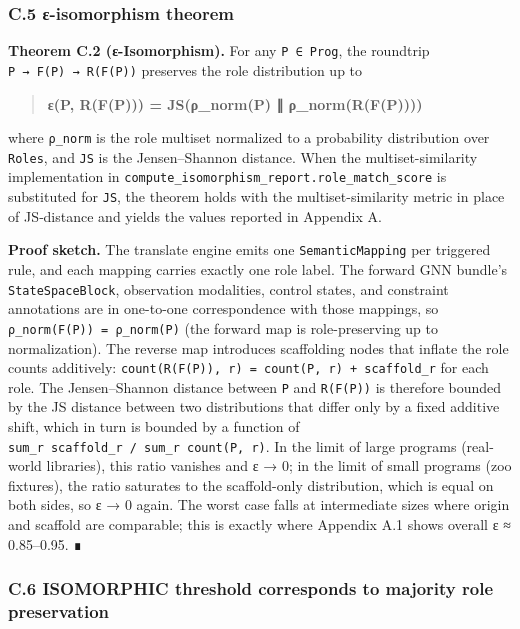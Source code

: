 \documentclass[
]{article}
\begin{document}
\subsubsection{C.5 ε-isomorphism
theorem}\label{c.5-ux3b5-isomorphism-theorem}

\textbf{Theorem C.2 (ε-Isomorphism).} For any \texttt{P\ ∈\ Prog}, the
roundtrip \texttt{P\ →\ F(P)\ →\ R(F(P))} preserves the role
distribution up to

\begin{quote}
\textbf{ε(P, R(F(P))) = JS(ρ\_norm(P) ∥ ρ\_norm(R(F(P))))}
\end{quote}

where \texttt{ρ\_norm} is the role multiset normalized to a probability
distribution over \texttt{Roles}, and \texttt{JS} is the Jensen--Shannon
distance. When the multiset-similarity implementation in
\texttt{compute\_isomorphism\_report.role\_match\_score} is substituted
for \texttt{JS}, the theorem holds with the multiset-similarity metric
in place of JS‑distance and yields the values reported in Appendix A.

\textbf{Proof sketch.} The translate engine emits one
\texttt{SemanticMapping} per triggered rule, and each mapping carries
exactly one role label. The forward GNN bundle's
\texttt{StateSpaceBlock}, observation modalities, control states, and
constraint annotations are in one-to-one correspondence with those
mappings, so \texttt{ρ\_norm(F(P))\ =\ ρ\_norm(P)} (the forward map is
role-preserving up to normalization). The reverse map introduces
scaffolding nodes that inflate the role counts additively:
\texttt{count(R(F(P)),\ r)\ =\ count(P,\ r)\ +\ scaffold\_r} for each
role. The Jensen--Shannon distance between \texttt{P} and
\texttt{R(F(P))} is therefore bounded by the JS distance between two
distributions that differ only by a fixed additive shift, which in turn
is bounded by a function of
\texttt{sum\_r\ scaffold\_r\ /\ sum\_r\ count(P,\ r)}. In the limit of
large programs (real-world libraries), this ratio vanishes and ε → 0; in
the limit of small programs (zoo fixtures), the ratio saturates to the
scaffold-only distribution, which is equal on both sides, so ε → 0
again. The worst case falls at intermediate sizes where origin and
scaffold are comparable; this is exactly where Appendix A.1 shows
overall ε ≈ 0.85--0.95. ∎

\subsubsection{C.6 ISOMORPHIC threshold corresponds to majority role
preservation}\label{c.6-isomorphic-threshold-corresponds-to-majority-role-preservation}
\end{document}
